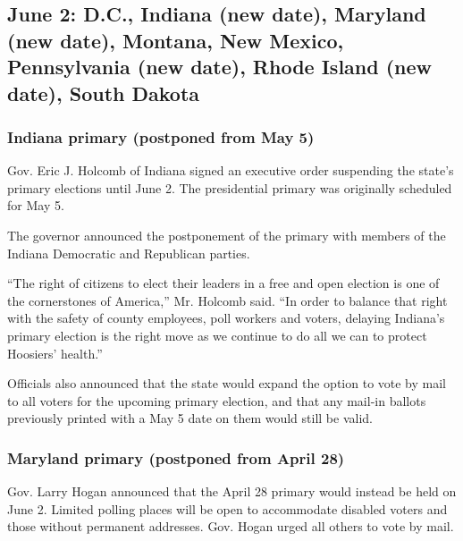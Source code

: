 \hypertarget{june-2-dc-indiana-new-date-maryland-new-date-montana-new-mexico-pennsylvania-new-date-rhode-island-new-date-south-dakota}{%
\subsection{June 2: D.C., Indiana (new date), Maryland (new date),
Montana, New Mexico, Pennsylvania (new date), Rhode Island (new date),
South
Dakota}\label{june-2-dc-indiana-new-date-maryland-new-date-montana-new-mexico-pennsylvania-new-date-rhode-island-new-date-south-dakota}}

\hypertarget{indiana-primary-postponed-from-may-5}{%
\subsubsection{Indiana primary (postponed from May
5)}\label{indiana-primary-postponed-from-may-5}}

Gov. Eric J. Holcomb of Indiana signed an executive order suspending the
state's primary elections until June 2. The presidential primary was
originally scheduled for May 5.

The governor announced the postponement of the primary with members of
the Indiana Democratic and Republican parties.

``The right of citizens to elect their leaders in a free and open
election is one of the cornerstones of America,'' Mr. Holcomb said. ``In
order to balance that right with the safety of county employees, poll
workers and voters, delaying Indiana's primary election is the right
move as we continue to do all we can to protect Hoosiers' health.''

Officials also announced that the state would expand the option to vote
by mail to all voters for the upcoming primary election, and that any
mail-in ballots previously printed with a May 5 date on them would still
be valid.

\hypertarget{maryland-primary-postponed-from-april-28}{%
\subsubsection{Maryland primary (postponed from April
28)}\label{maryland-primary-postponed-from-april-28}}

Gov. Larry Hogan announced that the April 28 primary would instead be
held on June 2. Limited polling places will be open to accommodate
disabled voters and those without permanent addresses. Gov. Hogan urged
all others to vote by mail.

